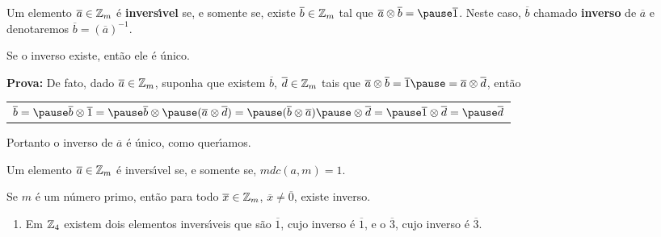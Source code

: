 \documentclass{beamer}
\begin{document}
    \begin{frame}
        \begin{definicao}
            Um elemento $\overline{a} \in \mathbb{Z}_m$ {\'e} \textbf{invers{\'\i}vel} \pause se, e somente se, existe $\overline{b} \in \mathbb{Z}_m$ \pause tal que $\overline{a} \otimes \overline{b} = \pause \overline{1}$. \pause Neste caso, $\overline{b}$  chamado \textbf{inverso} de $\overline{a}$ \pause e denotaremos $\overline{b} = (\overline{a})^{-1}$.\pause
        \end{definicao}

        \begin{proposicao}
            Se o inverso existe, \pause ent\~ao ele {\'e} {\'u}nico.\pause
        \end{proposicao}
        \noindent \textbf{Prova:} \pause 
            De fato, \pause dado $\overline{a} \in \mathbb{Z}_m$, \pause suponha que existem $\overline{b}$, \pause $\overline{d} \in \mathbb{Z}_m$ \pause tais que $\overline{a} \otimes \overline{b} = \overline{1} \pause = \overline{a} \otimes \overline{d}$, \pause ent{\~a}o\pause
            \begin{center}
                \begin{tabular}{l}
                    $\overline{b} = \pause \overline{b} \otimes \overline{1} = \pause \overline{b} \otimes \pause (\overline{a} \otimes \overline{d}) = \pause (\overline{b} \otimes \overline{a}) \pause \otimes \overline{d} = \pause \overline{1} \otimes \overline{d} = \pause \overline{d}$\pause
                \end{tabular}
            \end{center}
        Portanto o inverso de $\overline{a}$ \'e \'unico, \pause como quer{\'\i}amos. \hspace{.5cm}\qedsymbol\pause
    \end{frame}

    \begin{frame}
        \begin{proposicao}
            Um elemento $\overline{a} \in \mathbb{Z}_m$ {\'e} \pause invers{\'\i}vel \pause se, e somente se, $mdc(a,m) = 1$.\pause
        \end{proposicao}

        \begin{corolario}
            Se $m$ \'e um n\'umero primo, \pause ent\~ao para todo $\overline{x} \in \mathbb{Z}_m$, \pause $\overline{x} \ne \overline{0}$, \pause existe inverso.\pause
        \end{corolario}

        \begin{exemplos}
            \begin{enumerate}[label={\arabic*})]
                \item[i)] Em $\mathbb{Z}_4$ existem dois elementos invers{\'\i}veis \pause que s{\~a}o $\overline{1}$, \pause cujo inverso {\'e} $\overline{1}$, \pause e o $\overline{3}$, \pause cujo inverso {\'e} $\overline{3}$.\pause
            \end{enumerate}
        \end{exemplos}
    \end{frame}
\end{document}
